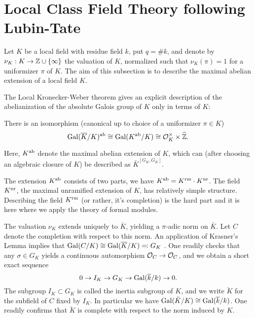 \documentclass[../main.tex]{subfiles}
\begin{document}
\section{Local Class Field Theory following Lubin-Tate} %
\label{sec:Local Class Field Theory}
Let $K$ be a local field with residue field $k$, put $q = \# k$, and 
denote by $\nu_K: K \to \mathbb{Z} \cup \{\infty\}$ the valuation of $K$, normalized
such that $\nu_K(\pi) = 1$ for a uniformizer $\pi$ of $K$.
The aim of this subsection is to describe the maximal abelian extension of
a local field $K$.

The Local Kronecker-Weber theorem gives an explicit description of the
abelianization of the absolute Galois group of $K$ only in terms of $K$:

\begin{thm}\label{thm:localKW}
  There is an isomorphism (canonical up to choice of a uniformizer 
  $\pi \in K$)
  \begin{equation*}
    \operatorname{Gal}(\overline K/K)^{\mathrm{ab}} \cong \operatorname{Gal}(K^{\mathrm{ab}}/K) \cong \mathcal{O}_K^\times
    \times \widehat {\mathbb{Z}}.
  \end{equation*}
\end{thm}
Here, $K^{\mathrm{ab}}$ denote the maximal abelian extension of $K$, which can (after choosing
an algebraic closure of $K$) be described as $\bar K^{[G_K, G_K]}$. 

The extension $K^{\mathrm{ab}}$ consists of two parts, we have 
$K^{\mathrm{ab}} = K^{\mathrm{rm}} \cdot K^{\mathrm{nr}}$. The field $K^{\mathrm{nr}}$, the maximal unramified extension
of $K$, has relatively simple structure. 
Describing the field $K^{\mathrm{rm}}$ (or rather, it's completion) is the hard part and
it is here where we apply the theory of formal modules.

The valuation $\nu_K$ extends uniquely to $\bar K$, yielding a
$\pi$-adic norm on $\bar K$. Let $C$ denote the completion with respect to this
norm. An application of Krasner's Lemma implies that $\operatorname{Gal}(C/K) \cong \operatorname{Gal}(\overline
K/K) \eqqcolon G_K$
. One readily checks that any $\sigma \in G_K$ yields a 
continuous automorphism $\mathcal{O}_C \to \mathcal{O}_C$, and we obtain a short exact sequence 
\begin{equation*}
  0 \to I_K \to G_K \to \operatorname{Gal}(\overline k /k) \to 0.
\end{equation*}
The subgroup $I_K \subset G_K$ is called the inertia subgroup of $K$,
and we write $\breve K$ for the subfield of $C$ fixed by $I_K$. In particular
we have $\operatorname{Gal}(\breve K /K) \cong \operatorname{Gal}(\overline k /k)$. One readily confirms that 
$\breve K$ is complete with respect to the norm induced by $K$. 
\end{document}

